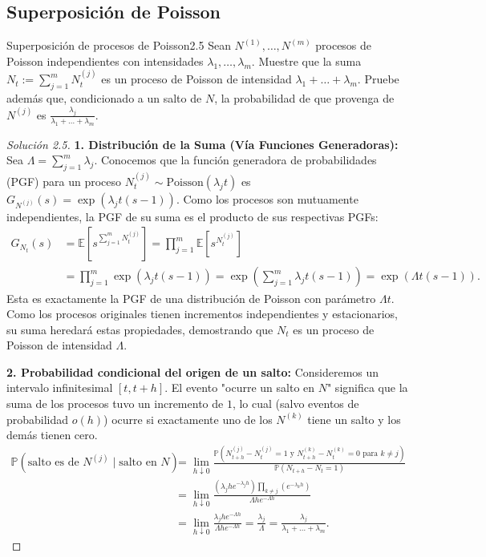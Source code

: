 \documentclass[10pt,a4paper]{article}
\begin{document}
\newpage

\subsection{Superposición de Poisson}

\begin{ejercicio}{Superposición de procesos de Poisson}{2.5}
    Sean $N^{(1)}, \dots, N^{(m)}$ procesos de Poisson independientes con intensidades $\lambda_1, \dots, \lambda_m$. Muestre que la suma $N_t := \sum_{j=1}^m N_t^{(j)}$ es un proceso de Poisson de intensidad $\lambda_1 + \dots + \lambda_m$. Pruebe además que, condicionado a un salto de $N$, la probabilidad de que provenga de $N^{(j)}$ es $\frac{\lambda_j}{\lambda_1 + \dots + \lambda_m}$.
\end{ejercicio}


\begin{proof}[Solución 2.5]
    \textbf{1. Distribución de la Suma (Vía Funciones Generadoras):}
    Sea $\Lambda = \sum_{j=1}^m \lambda_j$. Conocemos que la función generadora de probabilidades (PGF) para un proceso $N_t^{(j)} \sim \text{Poisson}(\lambda_j t)$ es $G_{N^{(j)}}(s) = \exp(\lambda_j t (s-1))$.
    Como los procesos son mutuamente independientes, la PGF de su suma es el producto de sus respectivas PGFs:
    \begin{align*}
        G_{N_t}(s) &= \mathbb{E}\left[s^{\sum_{j=1}^m N_t^{(j)}}\right] = \prod_{j=1}^m \mathbb{E}\left[s^{N_t^{(j)}}\right] \\
        &= \prod_{j=1}^m \exp(\lambda_j t (s-1)) = \exp\left( \sum_{j=1}^m \lambda_j t (s-1) \right) = \exp(\Lambda t (s-1)).
    \end{align*}
    Esta es exactamente la PGF de una distribución de Poisson con parámetro $\Lambda t$. Como los procesos originales tienen incrementos independientes y estacionarios, su suma heredará estas propiedades, demostrando que $N_t$ es un proceso de Poisson de intensidad $\Lambda$.

    \textbf{2. Probabilidad condicional del origen de un salto:}
    Consideremos un intervalo infinitesimal $[t, t+h]$. El evento "ocurre un salto en $N$" significa que la suma de los procesos tuvo un incremento de $1$, lo cual (salvo eventos de probabilidad $o(h)$) ocurre si exactamente uno de los $N^{(k)}$ tiene un salto y los demás tienen cero.
    \begin{align*}
        \mathbb{P}(\text{salto es de } N^{(j)} \mid \text{salto en } N) &= \lim_{h \downarrow 0} \frac{\mathbb{P}(N_{t+h}^{(j)} - N_t^{(j)} = 1 \text{ y } N_{t+h}^{(k)} - N_t^{(k)} = 0 \text{ para } k \neq j)}{\mathbb{P}(N_{t+h} - N_t = 1)} \\
        &= \lim_{h \downarrow 0} \frac{ (\lambda_j h e^{-\lambda_j h}) \prod_{k \neq j} (e^{-\lambda_k h}) }{ \Lambda h e^{-\Lambda h} } \\
        &= \lim_{h \downarrow 0} \frac{\lambda_j h e^{-\Lambda h}}{\Lambda h e^{-\Lambda h}} = \frac{\lambda_j}{\Lambda} = \frac{\lambda_j}{\lambda_1 + \dots + \lambda_m}.
    \end{align*}
\end{proof}
\end{document}

